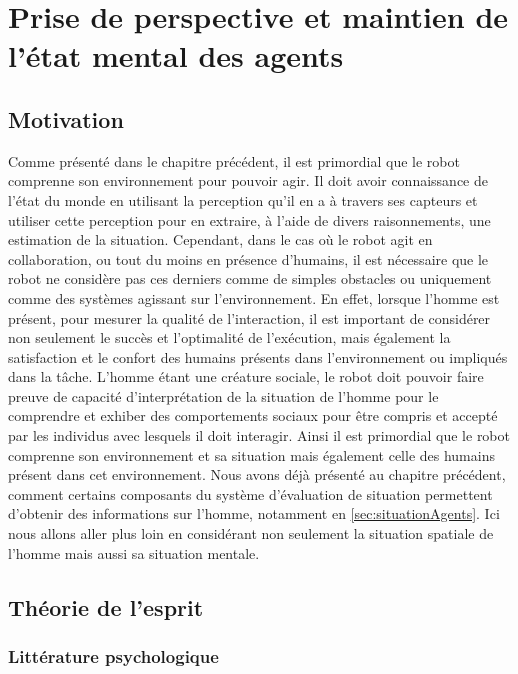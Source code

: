 \documentclass[a4paper,11pt,twoside]{StyleThese}
\begin{document}
\setcounter{chapter}{1} %
\dominitoc
\faketableofcontents
\fi

\chapter{Prise de perspective et maintien de l'état mental des agents}
\label{chapter2}
\minitoc

\section{Motivation}
\label{sec:motivation}
Comme présenté dans le chapitre précédent, il est primordial que le robot comprenne son environnement pour pouvoir agir. Il doit avoir connaissance de l'état du monde en utilisant la perception qu'il en a à travers ses capteurs et utiliser cette perception pour en extraire, à l'aide de divers raisonnements, une estimation de la situation. Cependant, dans le cas où le robot agit en collaboration, ou tout du moins en présence d'humains, il est nécessaire que le robot ne considère pas ces derniers comme de simples obstacles ou uniquement comme des systèmes agissant sur l'environnement. En effet, lorsque l'homme est présent, pour mesurer la qualité de l'interaction, il est important de considérer non seulement le succès et l'optimalité de l'exécution, mais également la satisfaction et le confort des humains présents dans l'environnement ou impliqués dans la tâche. L'homme étant une créature sociale, le robot doit pouvoir faire preuve de capacité d'interprétation de la situation de l'homme pour le comprendre et exhiber des comportements sociaux pour être compris et accepté par les individus avec lesquels il doit interagir.
Ainsi il est primordial que le robot comprenne son environnement et sa situation mais également celle des humains présent dans cet environnement.
Nous avons déjà présenté au chapitre précédent, comment certains composants du système d'évaluation de situation permettent d'obtenir des informations sur l'homme, notamment en \ref{sec:situationAgents}. Ici nous allons aller plus loin en considérant non seulement la situation spatiale de l'homme mais aussi sa situation mentale.

\section{Théorie de l'esprit}
\subsection{Littérature psychologique}
\label{sec:psy}
\end{document}
